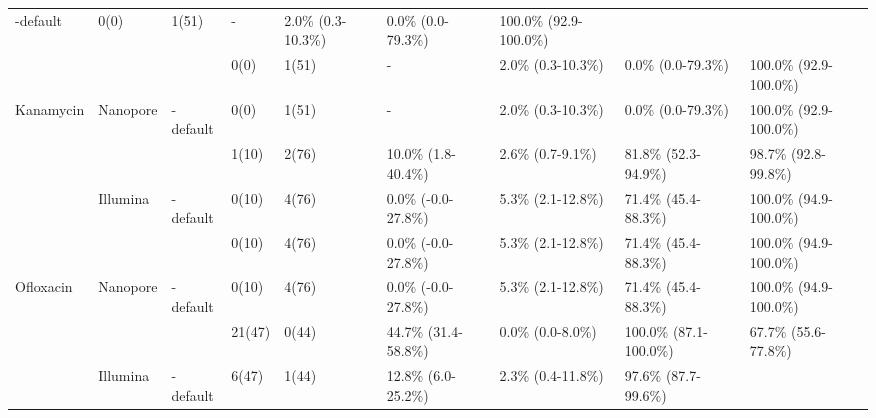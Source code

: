 \begin{table}
{\begin{tabular}{|l|l|l|l|l|l|l|l|l|}
  \cellcolor[HTML]{EFEFEF}\mykrobe{}-default &
  \cellcolor[HTML]{EFEFEF}0(0) &
  \cellcolor[HTML]{EFEFEF}1(51) &
  \cellcolor[HTML]{EFEFEF}- &
  \cellcolor[HTML]{EFEFEF}2.0\% (0.3-10.3\%) &
  \cellcolor[HTML]{EFEFEF}0.0\% (0.0-79.3\%) &
  \cellcolor[HTML]{EFEFEF}100.0\% (92.9-100.0\%) \\ \cline{2-9} 
 &
   &
  \mykrobe{} &
  0(0) &
  1(51) &
  - &
  2.0\% (0.3-10.3\%) &
  0.0\% (0.0-79.3\%) &
  100.0\% (92.9-100.0\%) \\ \cline{3-9} 
\multirow{-4}{*}{Kanamycin} &
  \multirow{-2}{*}{Nanopore} &
  \cellcolor[HTML]{EFEFEF}\mykrobe{}-default &
  \cellcolor[HTML]{EFEFEF}0(0) &
  \cellcolor[HTML]{EFEFEF}1(51) &
  \cellcolor[HTML]{EFEFEF}- &
  \cellcolor[HTML]{EFEFEF}2.0\% (0.3-10.3\%) &
  \cellcolor[HTML]{EFEFEF}0.0\% (0.0-79.3\%) &
  \cellcolor[HTML]{EFEFEF}100.0\% (92.9-100.0\%) \\ \hline
 &
   &
  \mykrobe{} &
  1(10) &
  2(76) &
  10.0\% (1.8-40.4\%) &
  2.6\% (0.7-9.1\%) &
  81.8\% (52.3-94.9\%) &
  98.7\% (92.8-99.8\%) \\ \cline{3-9} 
 &
  \multirow{-2}{*}{Illumina} &
  \cellcolor[HTML]{EFEFEF}\mykrobe{}-default &
  \cellcolor[HTML]{EFEFEF}0(10) &
  \cellcolor[HTML]{EFEFEF}4(76) &
  \cellcolor[HTML]{EFEFEF}0.0\% (-0.0-27.8\%) &
  \cellcolor[HTML]{EFEFEF}5.3\% (2.1-12.8\%) &
  \cellcolor[HTML]{EFEFEF}71.4\% (45.4-88.3\%) &
  \cellcolor[HTML]{EFEFEF}100.0\% (94.9-100.0\%) \\ \cline{2-9} 
 &
   &
  \mykrobe{} &
  0(10) &
  4(76) &
  0.0\% (-0.0-27.8\%) &
  5.3\% (2.1-12.8\%) &
  71.4\% (45.4-88.3\%) &
  100.0\% (94.9-100.0\%) \\ \cline{3-9} 
\multirow{-4}{*}{Ofloxacin} &
  \multirow{-2}{*}{Nanopore} &
  \cellcolor[HTML]{EFEFEF}\mykrobe{}-default &
  \cellcolor[HTML]{EFEFEF}0(10) &
  \cellcolor[HTML]{EFEFEF}4(76) &
  \cellcolor[HTML]{EFEFEF}0.0\% (-0.0-27.8\%) &
  \cellcolor[HTML]{EFEFEF}5.3\% (2.1-12.8\%) &
  \cellcolor[HTML]{EFEFEF}71.4\% (45.4-88.3\%) &
  \cellcolor[HTML]{EFEFEF}100.0\% (94.9-100.0\%) \\ \hline
 &
   &
  \mykrobe{} &
  21(47) &
  0(44) &
  44.7\% (31.4-58.8\%) &
  0.0\% (0.0-8.0\%) &
  100.0\% (87.1-100.0\%) &
  67.7\% (55.6-77.8\%) \\ \cline{3-9} 
 &
  \multirow{-2}{*}{Illumina} &
  \cellcolor[HTML]{EFEFEF}\mykrobe{}-default &
  \cellcolor[HTML]{EFEFEF}6(47) &
  \cellcolor[HTML]{EFEFEF}1(44) &
  \cellcolor[HTML]{EFEFEF}12.8\% (6.0-25.2\%) &
  \cellcolor[HTML]{EFEFEF}2.3\% (0.4-11.8\%) &
  \cellcolor[HTML]{EFEFEF}97.6\% (87.7-99.6\%) &

\end{tabular}}
\end{table}

